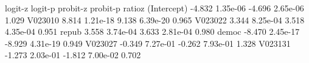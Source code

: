 \begin{Schunk}
\begin{Soutput}
            logit-z  logit-p probit-z probit-p ratioz
(Intercept)  -4.832 1.35e-06   -4.696 2.65e-06  1.029
V023010       8.814 1.21e-18    9.138 6.39e-20  0.965
V023022       3.344 8.25e-04    3.518 4.35e-04  0.951
repub         3.558 3.74e-04    3.633 2.81e-04  0.980
democ        -8.470 2.45e-17   -8.929 4.31e-19  0.949
V023027      -0.349 7.27e-01   -0.262 7.93e-01  1.328
V023131      -1.273 2.03e-01   -1.812 7.00e-02  0.702
\end{Soutput}
\end{Schunk}
